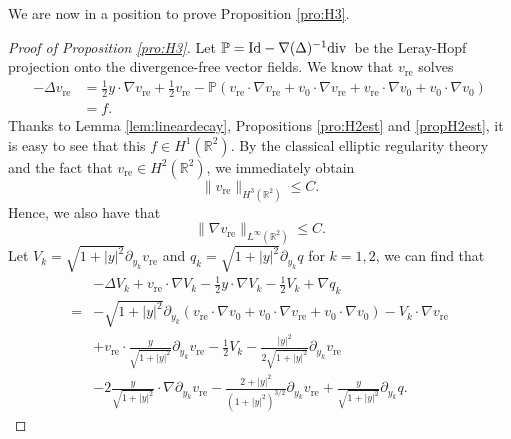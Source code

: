 \documentclass[12pt]{amsart}
\renewcommand{\div}{{\rm div \thinspace }}
\numberwithin{equation}{section}              %
\theoremstyle{remark}
\begin{document}
		We are now in a position to prove Proposition \ref{pro:H3}.
		\begin{proof}[Proof of Proposition \ref{pro:H3}]
			Let $\mathbb{P} = \textrm{Id} - \nabla (\Delta)^{-1}\div$ be  the Leray-Hopf projection onto the divergence-free
			vector fields.
			We know that $v_{\text{re}}$ solves
			\begin{equation}
				\begin{aligned}
					-\Delta v_{\text{re}} &= \frac{1}{2}y \cdot \nabla v_{\text{re}} + \frac{1}{2}v_{\text{re}} - \mathbb{P}  (v_{\text{re}} \cdot \nabla v_{\text{re}} + v_0 \cdot \nabla v_{\text{re}} + v_{\text{re}} \cdot \nabla v_0 + v_0 \cdot \nabla v_0) \\
					&=f.
				\end{aligned}		
			\end{equation}
			Thanks to Lemma \ref{lem:lineardecay}, Propositions \ref{pro:H2est} and \ref{propH2est}, it is easy to see that this $f\in H^1(\mathbb{R}^2)$. By the classical elliptic regularity theory and the fact that $v_{\textrm{re}}\in H^2(\mathbb{R}^2)$, we immediately obtain
			\begin{equation*}
				\|v_{\textrm{re}}\|_{ H^3(\mathbb{R}^2)} \le C.
			\end{equation*}
			Hence, we also have that 
			\begin{equation*}
				\|\nabla v_{\textrm{re}}\|_{ L^{\infty}(\mathbb{R}^2)} \le C.
			\end{equation*}
			Let  $V_k = \sqrt{1+|y|^2} \partial_{y_k} v_{\text{re}}$ and $q_k = \sqrt{1+|y|^2} \partial_{y_k} q$ for $k=1,2$, we can find that	
\begin{equation}\label{eq:neweq}
\begin{aligned}
    &-\Delta V_k + v_{\text{re}} \cdot \nabla V_k - \frac{1}{2} y \cdot \nabla V_k - \frac{1}{2} V_k + \nabla q_k \\
    =& -\sqrt{1+|y|^2} \partial_{y_k}(v_{\text{re}} \cdot \nabla v_0 + v_0 \cdot \nabla v_{\text{re}} + v_0 \cdot \nabla v_0) - V_k \cdot \nabla v_{\text{re}} \\
    & + v_{\text{re}} \cdot \frac{y}{\sqrt{1+|y|^2}} \partial_{y_k} v_{\text{re}} - \frac{1}{2} V_k - \frac{|y|^2}{2\sqrt{1+|y|^2}} \partial_{y_k} v_{\text{re}} \\
    & - 2 \frac{y}{\sqrt{1+|y|^2}} \cdot \nabla \partial_{y_k} v_{\text{re}} - \frac{2+|y|^2}{(1+|y|^2)^{3/2}} \partial_{y_k} v_{\text{re}} + \frac{y}{\sqrt{1+|y|^2}} \partial_{y_k} q.
\end{aligned}
\end{equation}
		

\end{proof}
\end{document}
